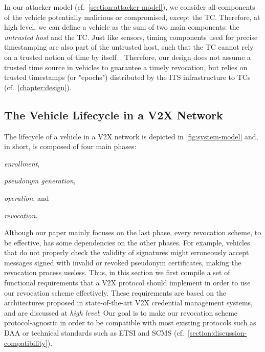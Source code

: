 In our attacker model (cf.~\cref{section:attacker-model}), we consider all
components of the vehicle potentially malicious or compromised, except the \ac{TC}.
Therefore, at high level, we can define a vehicle as the sum of two main
components: the \emph{untrusted host} and the \ac{TC}. Just like sensors, timing
components used for precise timestamping are also part of the untrusted host,
such that the \ac{TC} cannot rely on a trusted notion of time by
itself~\cite{alder2023about,anwar2019applications}. Therefore, our design does
not assume a trusted time source in vehicles to guarantee a timely revocation,
but relies on trusted timestamps (or "epochs") distributed by the \ac{ITS}
infrastructure to \acp{TC} (cf.~\cref{chapter:design}).

\subsection{The Vehicle Lifecycle in a \ac{V2X} Network}
\label{section:system-model}

The lifecycle of a vehicle in a \ac{V2X} network is depicted in
\cref{fig:system-model} and, in short, is composed of four main phases:
%
\begin{inparaenum}
    \item \emph{enrollment},
    \item \emph{pseudonym generation},
    \item \emph{operation}, and
    \item \emph{revocation}.
\end{inparaenum}
%
Although our paper mainly focuses on the last phase, every revocation scheme, to
be effective, has some dependencies on the other phases. For example, vehicles
that do not properly check the validity of signatures might erroneously accept
messages signed with invalid or revoked pseudonym certificates, making the
revocation process useless. Thus, in this section we first compile a set of
functional requirements that a \ac{V2X} protocol should implement in order to
use our revocation scheme effectively. These requirements are based on the
architectures proposed in state-of-the-art \ac{V2X} credential management
systems, and are discussed at \emph{high level}: Our goal is to make our
revocation scheme protocol-agnostic in order to be compatible with most existing
protocols such as \ac{DAA} or technical standards such as ETSI and SCMS
(cf.~\cref{section:discussion-compatibility}).

